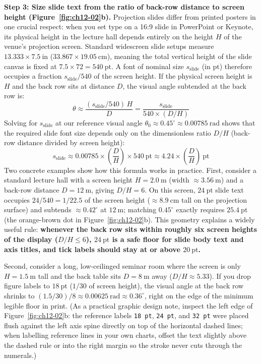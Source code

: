 \textbf{Step 3: Size slide text from the ratio of back-row distance to screen height (Figure~\ref{fig:ch12-02}b).} Projection slides differ from printed posters in one crucial respect: when you set type on a 16:9 slide in PowerPoint or Keynote, its physical height in the lecture hall depends entirely on the height $H$ of the venue's projection screen. Standard widescreen slide setups measure $13.333 \times 7.5\ \text{in}$ ($33.867 \times 19.05\ \text{cm}$), meaning the total vertical height of the slide canvas is fixed at $7.5 \times 72 = 540\ \text{pt}$. A font of nominal size $s_{\text{slide}}$ (in $\text{pt}$) therefore occupies a fraction $s_{\text{slide}} / 540$ of the screen height. If the physical screen height is $H$ and the back row sits at distance $D$, the visual angle subtended at the back row is:
\[
\theta \approx \frac{(s_{\text{slide}} / 540)\,H}{D} = \frac{s_{\text{slide}}}{540 \times (D/H)}
\]
Solving for $s_{\text{slide}}$ at our reference visual angle $\theta_0 \approx 0.45^\circ \approx 0.00785\ \text{rad}$ shows that the required slide font size depends only on the dimensionless ratio $D/H$ (back-row distance divided by screen height):
\[
s_{\text{slide}} \approx 0.00785 \times \left(\frac{D}{H}\right) \times 540\ \text{pt} \approx 4.24 \times \left(\frac{D}{H}\right)\ \text{pt}
\]
Two concrete examples show how this formula works in practice. First, consider a standard lecture hall with a screen height $H = 2.0\ \text{m}$ (width $\approx 3.56\ \text{m}$) and a back-row distance $D = 12\ \text{m}$, giving $D/H = 6$. On this screen, $24\ \text{pt}$ slide text occupies $24 / 540 = 1 / 22.5$ of the screen height ($\approx 8.9\ \text{cm}$ tall on the projection surface) and subtends $\approx 0.42^\circ$ at $12\ \text{m}$; matching $0.45^\circ$ exactly requires $25.4\ \text{pt}$ (the orange-brown dot in Figure~\ref{fig:ch12-02}b). This geometry explains a widely useful rule: \textbf{whenever the back row sits within roughly six screen heights of the display ($D/H \le 6$), $24\ \text{pt}$ is a safe floor for slide body text and axis titles, and tick labels should stay at or above $20\ \text{pt}$.}

Second, consider a long, low-ceilinged seminar room where the screen is only $H = 1.5\ \text{m}$ tall and the back table sits $D = 8\ \text{m}$ away ($D/H \approx 5.33$). If you drop figure labels to $18\ \text{pt}$ ($1/30$ of screen height), the visual angle at the back row shrinks to $(1.5 / 30) / 8 \approx 0.00625\ \text{rad} \approx 0.36^\circ$, right on the edge of the minimum legible floor in print. (As a practical graphic design note, inspect the left edge of Figure~\ref{fig:ch12-02}b: the reference labels \texttt{18 pt}, \texttt{24 pt}, and \texttt{32 pt} were placed flush against the left axis spine directly on top of the horizontal dashed lines; when labelling reference lines in your own charts, offset the text slightly above the dashed rule or into the right margin so the stroke never cuts through the numerals.)

